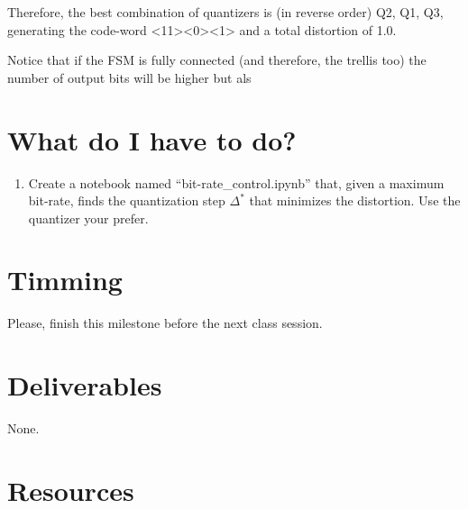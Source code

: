Therefore, the best combination of quantizers is (in reverse order)
Q2, Q1, Q3, generating the code-word <11><0><1> and a total distortion
of 1.0.

Notice that if the FSM is fully connected (and therefore, the trellis too) the number of output bits will be higher but als

\section{What do I have to do?}

\begin{enumerate}
\item Create a notebook named ``bit-rate\_control.ipynb'' that, given
  a maximum bit-rate, finds the quantization step $\Delta^*$ that
  minimizes the distortion. Use the quantizer your prefer.
\end{enumerate}


\section{Timming}

Please, finish this milestone before the next class session.

\section{Deliverables}

None.

\section{Resources}

\renewcommand{\addcontentsline}[3]{} %

